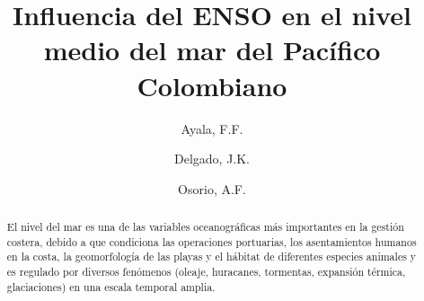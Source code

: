 \documentclass[5p,times,authoryear]{elsarticle}
\begin{document}
\begin{frontmatter}






\title{Influencia del ENSO en el nivel medio del mar del Pacífico Colombiano}


\author[First]{Ayala, F.F. }

\author[First,Second]{Delgado, J.K.}

\author[First]{Osorio, A.F.}


\address[First]{Grupo de investigación en oceanografía e ingeniería costera, OCEANICOS, Universidad Nacional de Colombia, Sede Medellín, Colombia}
\address[Second]{Coastal solutions fellows program, Cornell Lab of Ornithology, Cornell University, USA}


\begin{abstract}

El nivel del mar es una de las variables oceanográficas más importantes en la gestión costera, debido a que condiciona las operaciones portuarias, los asentamientos humanos en la costa, la geomorfología de las playas y el hábitat de diferentes especies animales y es regulado por diversos fenómenos (oleaje, huracanes, tormentas, expansión térmica, glaciaciones) en una escala temporal amplia. 


\end{abstract}
\end{frontmatter}
\end{document}
